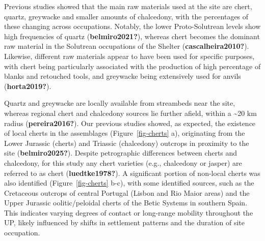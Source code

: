 \documentclass[
  a4paper,
  DIV=11,
  numbers=noendperiod]{scrreprt}
\begin{document}
Previous studies showed that the main raw materials used at the site are
chert, quartz, greywacke and smaller amounts of chalcedony, with the
percentages of these changing across occupations. Notably, the lower
Proto-Solutrean levels show high frequencies of quartz
(\textbf{belmiro2021?}), whereas chert becomes the dominant raw material
in the Solutrean occupations of the Shelter (\textbf{cascalheira2010?}).
Likewise, different raw materials appear to have been used for specific
purposes, with chert being particularly associated with the production
of high percentage of blanks and retouched tools, and greywacke being
extensively used for anvils (\textbf{horta2019?}).

Quartz and greywacke are locally available from streambeds near the
site, whereas regional chert and chalcedony sources lie further afield,
within a \textasciitilde20 km radius (\textbf{pereira2016?}). Our
previous studies showed, as expected, the existence of local cherts in
the assemblages (Figure~\ref{fig-cherts} a), originating from the Lower
Jurassic (cherts) and Triassic (chalcedony) outcrops in proximity to the
site (\textbf{belmiro2025?}). Despite petrographic differences between
cherts and chalcedony, for this study any chert varieties (e.g.,
chalcedony or jasper) are referred to as chert (\textbf{luedtke1978?}).
A significant portion of non-local cherts was also identified
(Figure~\ref{fig-cherts} b-c), with some identified sources, such as the
Cretaceous outcrops of central Portugal (Lisbon and Rio Maior areas) and
the Upper Jurassic oolitic/peloidal cherts of the Betic Systems in
southern Spain. This indicates varying degrees of contact or long-range
mobility throughout the UP, likely influenced by shifts in settlement
patterns and the duration of site occupation.
\end{document}
